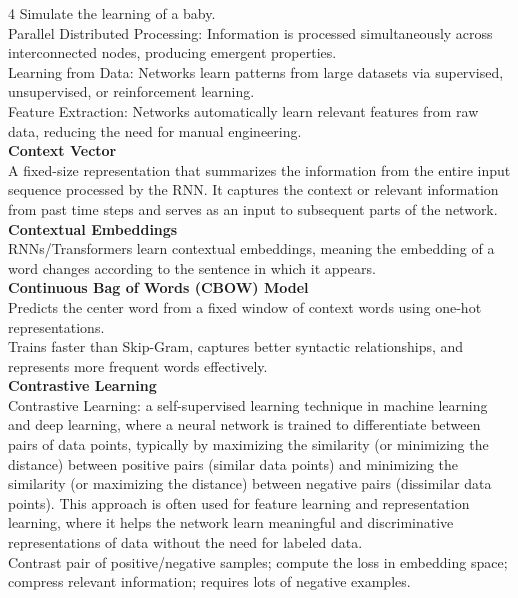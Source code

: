 \documentclass[8pt]{extarticle}
\begin{document}
\begin{multicols}{4}
Simulate the learning of a baby.\\
Parallel Distributed Processing: Information is processed simultaneously across interconnected nodes, producing emergent properties.\\
Learning from Data: Networks learn patterns from large datasets via supervised, unsupervised, or reinforcement learning.\\
Feature Extraction: Networks automatically learn relevant features from raw data, reducing the need for manual engineering.\\
\vspace{2pt}\textbf{Context Vector}\\
A fixed-size representation that summarizes the information from the entire input sequence processed by the RNN. It captures the context or relevant information from past time steps and serves as an input to subsequent parts of the network.\\
\vspace{2pt}\textbf{Contextual Embeddings}\\
RNNs/Transformers learn contextual embeddings, meaning the embedding of a word changes according to the sentence in which it appears.\\
\vspace{2pt}\textbf{Continuous Bag of Words (CBOW) Model}\\
Predicts the center word from a fixed window of context words using one-hot representations.\\
Trains faster than Skip-Gram, captures better syntactic relationships, and represents more frequent words effectively.\\
\vspace{2pt}\textbf{Contrastive Learning}\\
Contrastive Learning: a self-supervised learning technique in machine learning and deep learning, where a neural network is trained to differentiate between pairs of data points, typically by maximizing the similarity (or minimizing the distance) between positive pairs (similar data points) and minimizing the similarity (or maximizing the distance) between negative pairs (dissimilar data points). This approach is often used for feature learning and representation learning, where it helps the network learn meaningful and discriminative representations of data without the need for labeled data.\\
Contrast pair of positive/negative samples; compute the loss in embedding space; compress relevant information; requires lots of negative examples.\\

\end{multicols}
\end{document}
